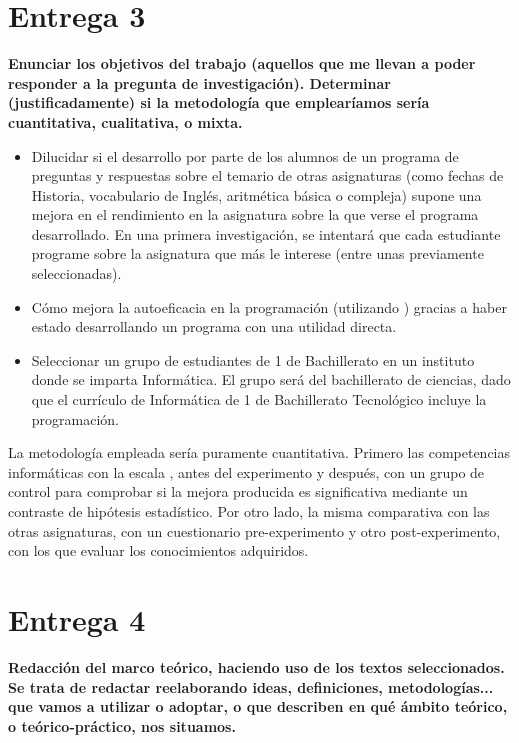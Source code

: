 \documentclass[palatino,nochap]{apuntesURJC}
\begin{document}
\section{Entrega 3}

\textbf{Enunciar los objetivos del trabajo (aquellos que me llevan a poder responder a la pregunta de investigación).
%
Determinar (justificadamente) si la metodología que emplearíamos sería cuantitativa, cualitativa, o mixta.}

\begin{itemize}
	\item Dilucidar si el desarrollo por parte de los alumnos de un programa de preguntas y respuestas sobre el temario de otras asignaturas (como fechas de Historia, vocabulario de Inglés, aritmética básica o compleja) supone una mejora en el rendimiento en la asignatura sobre la que verse el programa desarrollado.
	\subitem En una primera investigación, se intentará que cada estudiante programe sobre la asignatura que más le interese (entre unas previamente seleccionadas).
	\item Cómo mejora la autoeficacia en la programación (utilizando \cite{CPSES}) gracias a haber estado desarrollando un programa con una utilidad directa.
	\item Seleccionar un grupo de estudiantes de 1 de Bachillerato en un instituto donde se imparta Informática. 
	El grupo será del bachillerato de ciencias, dado que el currículo de Informática de 1 de Bachillerato Tecnológico incluye la programación.

\end{itemize}

La metodología empleada sería puramente cuantitativa. 
%
Primero las competencias informáticas con la escala \cite{CPSES}, antes del experimento y después, con un grupo de control para comprobar si la mejora producida es significativa mediante un contraste de hipótesis estadístico.
%
Por otro lado, la misma comparativa con las otras asignaturas, con un cuestionario pre-experimento y otro post-experimento, con los que evaluar los conocimientos adquiridos.

\section{Entrega 4}

\textbf{Redacción del marco teórico, haciendo uso de los textos seleccionados. Se trata de redactar reelaborando ideas, definiciones, metodologías... que vamos a utilizar o adoptar, o que describen en qué ámbito teórico, o teórico-práctico, nos situamos.}
\end{document}
